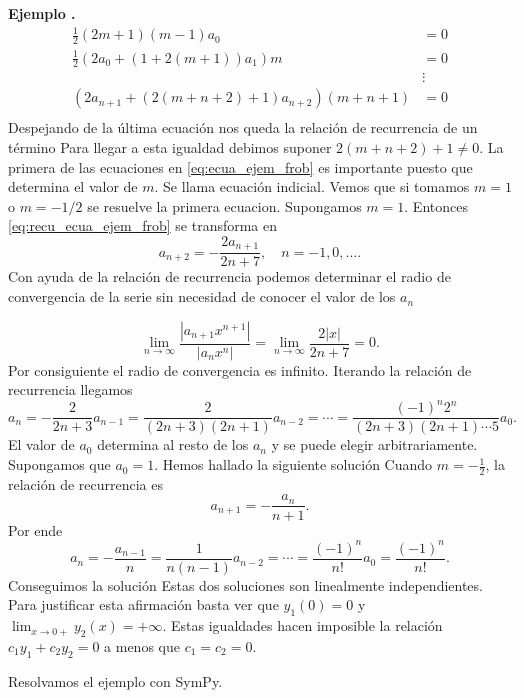 \documentclass{article}
\newcounter{ejemplo_cont}
\newenvironment{ejemplo}{\noindent\textbf{Ejemplo  \arabic{ejemplo_cont}.} }{\addtocounter{ejemplo_cont}{1}}
\begin{document}
\begin{ejemplo}
\begin{equation}\label{eq:ecua_ejem_frob}
    \begin{split}
      \frac12\left(2m+1\right)(m-1) a_0&=0\\
       \frac{1}{2}  \left(   2 a_{0} + (1+2(m+1)) a_{1}\right)m&=0\\
                                      &\vdots\\
     \left(   2a_{n+1}+ (2(m+n+2)+1)a_{n+2}  \right)(m+n+1) &=0\\
    \end{split}
\end{equation}
Despejando de la última ecuación nos queda la relación de recurrencia de un término
Para llegar a esta igualdad debimos suponer $2(m+n+2)+1\neq 0$. 
La primera de las ecuaciones en \eqref{eq:ecua_ejem_frob} es importante puesto que determina el valor de $m$. Se llama ecuación indicial. Vemos que si tomamos $m=1$ o $m=-1/2$ se resuelve la primera ecuacion. Supongamos $m=1$. Entonces \eqref{eq:recu_ecua_ejem_frob} se transforma en
\[
a_{n+2}=-\frac{2a_{n+1}}{2n+7},\quad n=-1,0,\ldots.
\]
Con ayuda de la relación de recurrencia podemos determinar el radio de convergencia de la serie sin necesidad de conocer el valor de los $a_n$

\[\lim_{n\to\infty}\frac{|a_{n+1}x^{n+1}|}{|a_{n}x^{n}|}=
\lim_{n\to\infty}\frac{2|x|}{2n+7}=0.\]
Por consiguiente el radio de convergencia es infinito.  Iterando la relación de recurrencia llegamos 
\[a_{n}=-\frac{2}{2n+3}a_{n-1}=\frac{2}{(2n+3)(2n+1)}a_{n-2}=\cdots=
\frac{(-1)^n2^{n}}{(2n+3)(2n+1)\cdots 5}a_0.\]
El valor de $a_0$ determina al resto de los $a_n$ y se puede elegir arbitrariamente. Supongamos que $a_0=1$. Hemos hallado la siguiente solución  
Cuando $m=-\frac12$, la relación de recurrencia es
\[a_{n+1}=-\frac{a_{n}}{n+1}.\]
Por ende
\[a_n=-\frac{a_{n-1}}{n}=\frac{1}{n(n-1)}a_{n-2}=\cdots=\frac{(-1)^n}{n!}a_{0}=\frac{(-1)^n}{n!}.\]
Conseguimos la solución
Estas dos soluciones son linealmente independientes. Para justificar esta afirmación basta ver que $y_1(0)=0$ y $\lim_{x\to 0+}y_2(x)=+\infty$. Estas igualdades hacen imposible la relación $c_1y_1+c_2y_2=0$ a menos que $c_1=c_2=0$.

Resolvamos el ejemplo con SymPy. 


\end{ejemplo}
\end{document}
